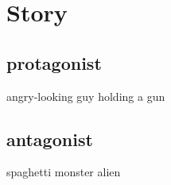 \chapter{Story}
\section{protagonist}
angry-looking guy holding a gun\\
\newpage
\section{antagonist}
spaghetti monster alien